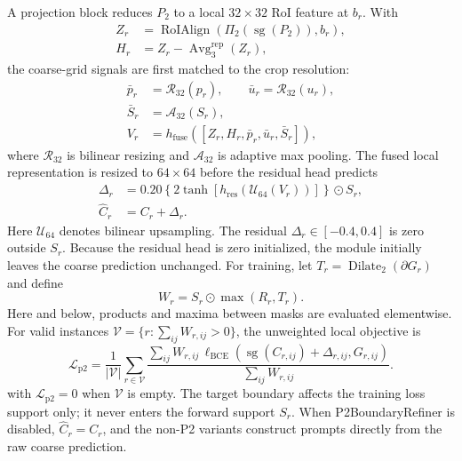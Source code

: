 \documentclass[letterpaper,journal]{IEEEtran}
\begin{document}
A projection block reduces $P_2$ to a local $32\times32$ RoI feature at $b_r$. With
\begin{equation}
\begin{aligned}
Z_r&=\operatorname{RoIAlign}
\!\left(\Pi_2(\operatorname{sg}(P_2)),b_r\right),\\
H_r&=Z_r-\operatorname{Avg}^{\mathrm{rep}}_3(Z_r),
\end{aligned}
\end{equation}
the coarse-grid signals are first matched to the crop resolution:
\begin{equation}
\begin{aligned}
\bar p_r&=\mathcal{R}_{32}(p_r),\qquad
\bar u_r=\mathcal{R}_{32}(u_r),\\
\bar S_r&=\mathcal{A}_{32}(S_r),\\
V_r&=h_{\mathrm{fuse}}([Z_r,H_r,\bar p_r,\bar u_r,\bar S_r]),
\end{aligned}
\label{eq:p2_fusion}
\end{equation}
where $\mathcal{R}_{32}$ is bilinear resizing and $\mathcal{A}_{32}$ is adaptive max pooling.
The fused local representation is resized to $64\times64$ before the residual head predicts
\begin{equation}
\begin{aligned}
\Delta_r&=0.20\left\{2\tanh\!\left[
h_{\mathrm{res}}(\mathcal{U}_{64}(V_r))\right]\right\}\odot S_r,\\
\widehat C_r&=C_r+\Delta_r.
\end{aligned}
\label{eq:p2_refinement}
\end{equation}
Here $\mathcal{U}_{64}$ denotes bilinear upsampling. The residual $\Delta_r\in[-0.4,0.4]$ is
zero outside $S_r$. Because the residual head is zero initialized, the module initially leaves
the coarse prediction unchanged. For training, let $T_r=\operatorname{Dilate}_2(\partial G_r)$
and define
\begin{equation}
W_r=S_r\odot\max(R_r,T_r).
\label{eq:p2_loss_support}
\end{equation}
Here and below, products and maxima between masks are evaluated elementwise.
For valid instances $\mathcal{V}=\{r:\sum_{ij}W_{r,ij}>0\}$, the unweighted local objective is
\begin{equation}
\mathcal{L}_{\mathrm{p2}}=
\frac{1}{|\mathcal{V}|}\sum_{r\in\mathcal{V}}
\frac{\sum_{ij}W_{r,ij}\,\ell_{\mathrm{BCE}}
(\operatorname{sg}(C_{r,ij})+\Delta_{r,ij},G_{r,ij})}
{\sum_{ij}W_{r,ij}}.
\label{eq:p2_loss}
\end{equation}
with $\mathcal{L}_{\mathrm{p2}}=0$ when $\mathcal{V}$ is empty.
The target boundary affects the training loss support only; it never enters the forward support
$S_r$. When P2BoundaryRefiner is disabled, $\widehat C_r=C_r$, and the non-P2 variants
construct prompts directly from the raw coarse prediction.
\end{document}
